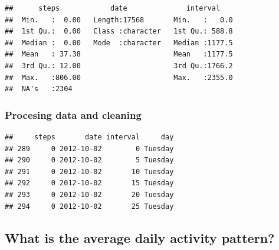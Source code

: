 \documentclass[
]{article}
\newenvironment{Shaded}{\begin{snugshade}}{\end{snugshade}}
\newcommand{\AttributeTok}[1]{\textcolor[rgb]{0.77,0.63,0.00}{#1}}
\newcommand{\FunctionTok}[1]{\textcolor[rgb]{0.00,0.00,0.00}{#1}}
\newcommand{\NormalTok}[1]{#1}
\newcommand{\OtherTok}[1]{\textcolor[rgb]{0.56,0.35,0.01}{#1}}
\newcommand{\SpecialCharTok}[1]{\textcolor[rgb]{0.00,0.00,0.00}{#1}}
\newcommand{\StringTok}[1]{\textcolor[rgb]{0.31,0.60,0.02}{#1}}
\begin{document}
\begin{verbatim}
##      steps            date              interval     
##  Min.   :  0.00   Length:17568       Min.   :   0.0  
##  1st Qu.:  0.00   Class :character   1st Qu.: 588.8  
##  Median :  0.00   Mode  :character   Median :1177.5  
##  Mean   : 37.38                      Mean   :1177.5  
##  3rd Qu.: 12.00                      3rd Qu.:1766.2  
##  Max.   :806.00                      Max.   :2355.0  
##  NA's   :2304
\end{verbatim}

\hypertarget{procesing-data-and-cleaning}{%
\subsubsection{Procesing data and
cleaning}\label{procesing-data-and-cleaning}}

\begin{Shaded}
\end{Shaded}

\begin{verbatim}
##     steps       date interval     day
## 289     0 2012-10-02        0 Tuesday
## 290     0 2012-10-02        5 Tuesday
## 291     0 2012-10-02       10 Tuesday
## 292     0 2012-10-02       15 Tuesday
## 293     0 2012-10-02       20 Tuesday
## 294     0 2012-10-02       25 Tuesday
\end{verbatim}

\hypertarget{what-is-the-average-daily-activity-pattern}{%
\subsection{What is the average daily activity
pattern?}\label{what-is-the-average-daily-activity-pattern}}
\end{document}

